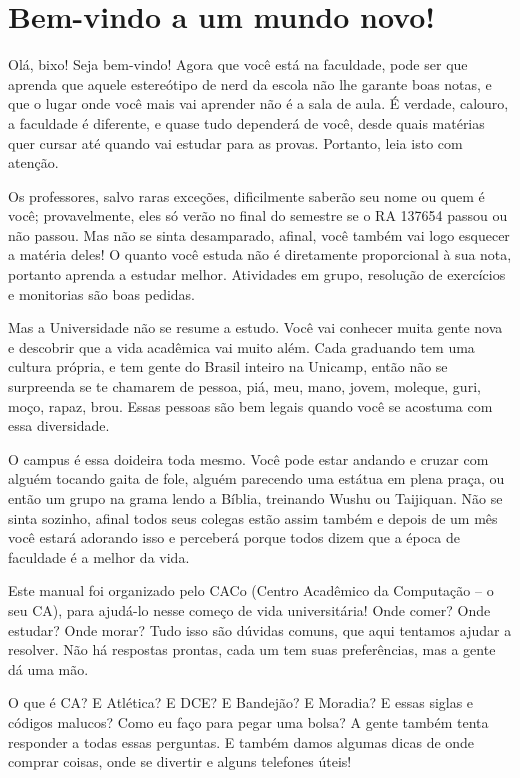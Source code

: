 
\section{Bem-vindo a um mundo novo!}

Olá, bixo! Seja bem-vindo! Agora que você está na faculdade, pode ser que aprenda que aquele estereótipo de nerd
da escola não lhe garante boas notas, e que o lugar onde você mais vai aprender não
é a sala de aula. É verdade, calouro, a faculdade é diferente, e quase tudo
dependerá de você, desde quais matérias quer cursar até quando vai estudar para
as provas. Portanto, leia isto com atenção.

Os professores, salvo raras exceções, dificilmente saberão seu nome ou quem é você; provavelmente, eles só verão
no final do semestre se o RA 137654  passou ou não passou. Mas não se sinta
desamparado, afinal, você também vai logo esquecer a matéria deles! O quanto você
estuda não é diretamente proporcional à sua nota, portanto aprenda a estudar
melhor. Atividades em grupo, resolução de exercícios e monitorias são boas pedidas.

Mas a Universidade não se resume a estudo. Você vai conhecer muita gente nova e
descobrir que a vida acadêmica vai muito além.
Cada graduando tem uma cultura própria, e tem gente do
Brasil inteiro na Unicamp, então não se surpreenda se te chamarem de
pessoa, piá, meu, mano, jovem, moleque, guri, moço, rapaz,
brou. Essas pessoas são bem legais quando você se acostuma com essa
diversidade.

O campus é essa doideira toda mesmo. Você pode estar andando e
cruzar com alguém tocando gaita de fole, alguém parecendo uma
estátua em plena praça, ou então um grupo na grama lendo a Bíblia, treinando
Wushu ou Taijiquan. Não se sinta sozinho, afinal todos seus colegas estão assim
também e depois de um mês você estará adorando isso e perceberá porque todos
dizem que a época de faculdade é a melhor da vida.

Este manual foi organizado pelo CACo (Centro Acadêmico da Computação -- o seu
CA), para ajudá-lo nesse começo de vida universitária! Onde comer? Onde estudar?
Onde morar? Tudo isso são dúvidas comuns, que aqui tentamos ajudar a resolver.
Não há respostas prontas, cada um tem suas preferências, mas a gente dá uma mão.

O que é CA? E Atlética? E DCE? E Bandejão? E Moradia? E essas siglas e códigos
malucos? Como eu faço para pegar uma bolsa? A gente também tenta responder a todas
essas perguntas. E também damos algumas dicas de onde comprar coisas, onde se
divertir e alguns telefones úteis!

